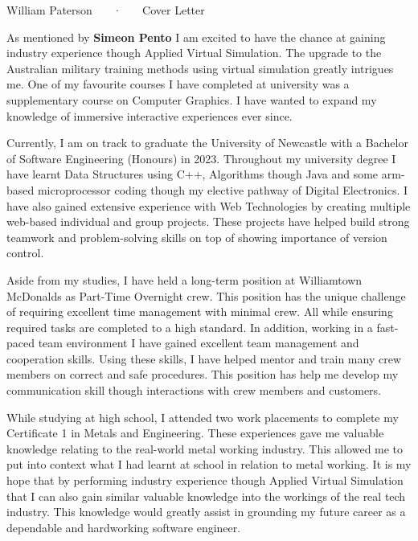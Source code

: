 \documentclass[11pt, a4paper]{awesome-cv}
\begin{document}
\makecvheader[L]

\makecvfooter
  {}
  {William Paterson ~~~·~~~ Cover Letter}
  {}

\makelettertitle

\begin{cvletter} 

As mentioned by \textbf{Simeon Pento} I am excited to have the chance at gaining industry experience though Applied Virtual Simulation. The upgrade to the Australian military training methods using virtual simulation greatly intrigues me. One of my favourite courses I have completed at university was a supplementary course on Computer Graphics. I have wanted to expand my knowledge of immersive interactive experiences ever since.

Currently, I am on track to graduate the University of Newcastle with a Bachelor of Software Engineering (Honours) in 2023. Throughout my university degree I have learnt Data Structures using C++, Algorithms though Java and some arm-based microprocessor coding though my elective pathway of Digital Electronics. I have also gained extensive experience with Web Technologies by creating multiple web-based individual and group projects. These projects have helped build strong teamwork and problem-solving skills on top of showing importance of version control.

Aside from my studies, I have held a long-term position at Williamtown McDonalds as Part-Time Overnight crew. This position has the unique challenge of requiring excellent time management with minimal crew. All while ensuring required tasks are completed to a high standard. In addition, working in a fast-paced team environment I have gained excellent team management and cooperation skills. Using these skills, I have helped mentor and train many crew members on correct and safe procedures. This position has help me develop my communication skill though interactions with crew members and customers.

While studying at high school, I attended two work placements to complete my Certificate 1 in Metals and Engineering. These experiences gave me valuable knowledge relating to the real-world metal working industry. This allowed me to put into context what I had learnt at school in relation to metal working. It is my hope that by performing industry experience though Applied Virtual Simulation that I can also gain similar valuable knowledge into the workings of the real tech industry. This knowledge would greatly assist in grounding my future career as a dependable and hardworking software engineer.  


\end{cvletter}


\makeletterclosing
\end{document}
